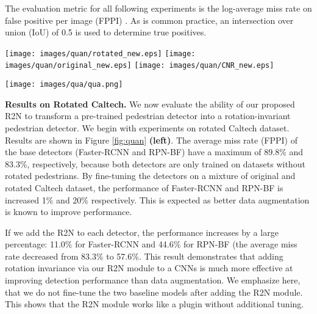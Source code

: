 \documentclass[10pt,twocolumn,letterpaper]{article}
\begin{document}
The evaluation metric for all following experiments is the log-average miss rate on false positive per image (FPPI) \cite{Dollar2012}. As is common practice, an intersection over union (IoU) of 0.5 is used to determine true positives. 



\begin{figure*}[!t]
\centering
    \texttt{[image: images/quan/rotated\_new.eps]}
    \texttt{[image: images/quan/original\_new.eps]}
    \texttt{[image: images/quan/CNR\_new.eps]}
    \caption{Quantitative results on rotated Caltech (\textbf{left}), original Caltech (\textbf{middle}) and YouTube Wearable dataset (\textbf{right}). Intersection of Union (IoU) of 0.5 is used to determine true positives.}
    \label{fig:quan}
\end{figure*}
\vspace{0.2cm}


\begin{figure*}[!t]
    \centering
    \texttt{[image: images/qua/qua.png]}
    \caption{Detection Results. Top 2 rows: rotated Caltech dataset. Bottom 2 rows: YouTube Wearable dataset.}
    \label{fig:qua}
\end{figure*}


\vspace{1mm}
\noindent\textbf{Results on Rotated Caltech.} We now evaluate the ability of our proposed R2N to transform a pre-trained pedestrian detector into a rotation-invariant pedestrian detector. We begin with experiments on rotated Caltech dataset. Results are shown in Figure \ref{fig:quan} \textbf{(left)}. The average miss rate (FPPI) of the base detectors (Faster-RCNN and RPN-BF) have a maximum of 89.8\% and 83.3\%, respectively, because both detectors are only trained on datasets without rotated pedestrians. By fine-tuning the detectors on a mixture of original and rotated Caltech dataset, the performance of Faster-RCNN and RPN-BF is increased 1\% and 20\% respectively. This is expected as better data augmentation is known to improve performance. 

If we add the R2N to each detector, the performance increases by a large percentage: 11.0\% for Faster-RCNN and 44.6\% for RPN-BF (the average miss rate decreased from 83.3\% to 57.6\%. This result demonstrates that adding rotation invariance via our R2N module to a CNNs is much more effective at improving detection performance than data augmentation. We emphasize here, that we do not fine-tune the two baseline models after adding the R2N module. This shows that the R2N module works like a plugin without additional tuning. 
\end{document}
